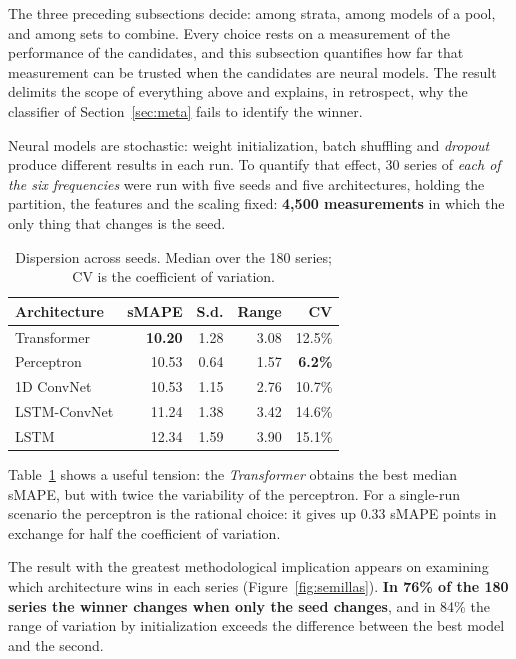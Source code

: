 The three preceding subsections decide: among strata, among models of a pool, and among
sets to combine. Every choice rests on a measurement of the performance of the candidates,
and this subsection quantifies how far that measurement can be trusted when the candidates
are neural models. The result delimits the scope of everything above and explains, in
retrospect, why the classifier of Section~\ref{sec:meta} fails to identify the winner.

Neural models are stochastic: weight initialization, batch shuffling and \emph{dropout}
produce different results in each run. To quantify that effect, 30 series of \emph{each of
the six frequencies} were run with five seeds and five architectures, holding the
partition, the features and the scaling fixed: \textbf{4{,}500 measurements} in which the
only thing that changes is the seed.

\begin{table}[htbp]
\centering
\caption{Dispersion across seeds. Median over the 180 series; CV is the coefficient of
variation.}
\label{tab:semillas}
\begin{tabular}{lrrrr}
\toprule
\textbf{Architecture} & \textbf{sMAPE} & \textbf{S.d.} & \textbf{Range} & \textbf{CV} \\
\midrule
Transformer  & \textbf{10.20} & 1.28 & 3.08 & 12.5\% \\
Perceptron   & 10.53 & 0.64 & 1.57 & \textbf{6.2\%} \\
1D ConvNet   & 10.53 & 1.15 & 2.76 & 10.7\% \\
LSTM-ConvNet & 11.24 & 1.38 & 3.42 & 14.6\% \\
LSTM         & 12.34 & 1.59 & 3.90 & 15.1\% \\
\bottomrule
\end{tabular}
\end{table}

Table~\ref{tab:semillas} shows a useful tension: the \emph{Transformer} obtains the best
median sMAPE, but with twice the variability of the perceptron. For a single-run scenario
the perceptron is the rational choice: it gives up $0.33$ sMAPE points in exchange for
half the coefficient of variation.

The result with the greatest methodological implication appears on examining which
architecture wins in each series (Figure~\ref{fig:semillas}). \textbf{In 76\% of the 180
series the winner changes when only the seed changes}, and in 84\% the range of variation
by initialization exceeds the difference between the best model and the second.

